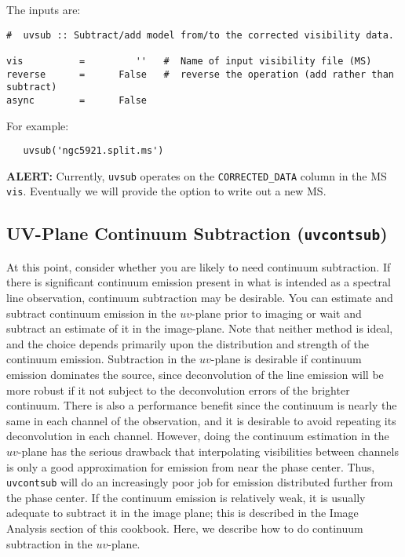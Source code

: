 {The inputs are:

\small
\begin{verbatim}
#  uvsub :: Subtract/add model from/to the corrected visibility data.

vis          =         ''   #  Name of input visibility file (MS)
reverse      =      False   #  reverse the operation (add rather than subtract)
async        =      False   
\end{verbatim}
\normalsize

For example:
\small
\begin{verbatim}
   uvsub('ngc5921.split.ms')
\end{verbatim}
\normalsize

{\bf ALERT:} Currently, {\tt uvsub} operates on the {\tt CORRECTED\_DATA}
column in the MS {\tt vis}.  Eventually we will provide the option to
write out a new MS.

\subsection{UV-Plane Continuum Subtraction ({\tt uvcontsub})}
\label{section:cal.other.uvcontsub}

At this point, consider whether you are likely to need continuum
subtraction.  If there is significant continuum emission present in
what is intended as a spectral line observation, continuum subtraction
may be desirable.  You can estimate and subtract continuum emission in
the $uv$-plane prior to imaging or wait and subtract an estimate of it
in the image-plane.  Note that neither method is ideal, and the choice
depends primarily upon the distribution and strength of the continuum
emission.  Subtraction in the $uv$-plane is desirable if continuum emission dominates
the source, since deconvolution of the line emission will be more robust
if it not subject to the deconvolution errors of the brighter continuum.
There is also a performance benefit since the continuum is nearly the same
in each channel of the observation, and it is desirable to avoid repeating
its deconvolution in each channel.  However, doing the continuum
estimation in the $uv$-plane has the serious drawback that interpolating
visibilities between channels is only a good approximation for emission
from near the phase center.  Thus, {\tt uvcontsub} will do an increasingly
poor job for emission distributed further from the phase center. 
If the continuum emission is relatively weak,
it is usually adequate to subtract it in the image plane; this is
described in the Image Analysis section of this cookbook.  Here, we
describe how to do continuum subtraction in the $uv$-plane.

}
